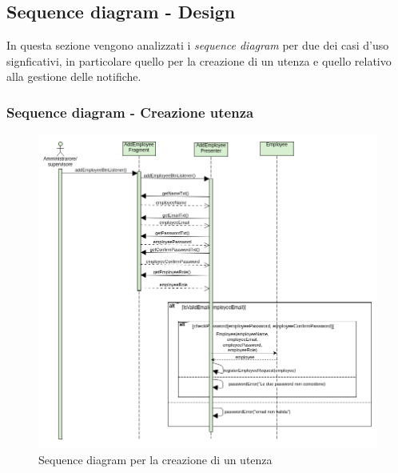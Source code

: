 \subsection{Sequence diagram - Design}
In questa sezione vengono analizzati i \textit{sequence diagram} per due dei casi d'uso signficativi, in particolare quello per la creazione di un utenza e quello relativo alla gestione delle notifiche.
\subsubsection{Sequence diagram - Creazione utenza}
\begin{figure}[H]
  \centering
  \includegraphics[scale=0.6]{img/sequence_diagram_design/creazioneUtenza.png}
  \caption{Sequence diagram per la creazione di un utenza}
\end{figure}
\newpage


